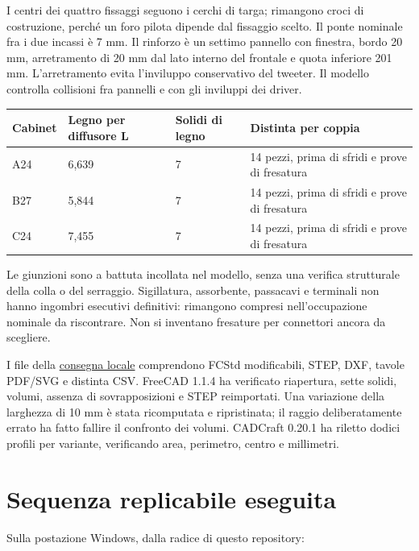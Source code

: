 \documentclass[
  italian,
  11pt,
  a4paper,
]{article}
\newcounter{none} %
\begin{document}
I centri dei quattro fissaggi seguono i cerchi di targa; rimangono croci di costruzione,
perché un foro pilota dipende dal fissaggio scelto. Il ponte nominale fra i due incassi è 7
mm. Il rinforzo è un settimo pannello con finestra, bordo 20 mm, arretramento di 20 mm dal
lato interno del frontale e quota inferiore 201 mm. L'arretramento evita l'inviluppo
conservativo del tweeter. Il modello controlla collisioni fra pannelli e con gli inviluppi
dei driver.

{\def\LTcaptype{none} %
\begin{longtable}[]{@{}llll@{}}
\toprule\noalign{}
Cabinet & Legno per diffusore L & Solidi di legno & Distinta per coppia \\
\midrule\noalign{}
\endhead
\bottomrule\noalign{}
\endlastfoot
A24 & 6,639 & 7 & 14 pezzi, prima di sfridi e prove di fresatura \\
B27 & 5,844 & 7 & 14 pezzi, prima di sfridi e prove di fresatura \\
C24 & 7,455 & 7 & 14 pezzi, prima di sfridi e prove di fresatura \\
\end{longtable}
}

Le giunzioni sono a battuta incollata nel modello, senza una verifica strutturale della
colla o del serraggio. Sigillatura, assorbente, passacavi e terminali non hanno ingombri
esecutivi definitivi: rimangono compresi nell'occupazione nominale da riscontrare. Non si
inventano fresature per connettori ancora da scegliere.

I file della \href{../../build/consegna-completamento-20261125/README.md}{consegna locale}
comprendono FCStd modificabili, STEP, DXF, tavole PDF/SVG e distinta CSV. FreeCAD 1.1.4 ha
verificato riapertura, sette solidi, volumi, assenza di sovrapposizioni e STEP reimportati.
Una variazione della larghezza di 10 mm è stata ricomputata e ripristinata; il raggio
deliberatamente errato ha fatto fallire il confronto dei volumi. CADCraft 0.20.1 ha riletto
dodici profili per variante, verificando area, perimetro, centro e millimetri.

\section{Sequenza replicabile eseguita}\label{sequenza-replicabile-eseguita}

Sulla postazione Windows, dalla radice di questo repository:
\end{document}
